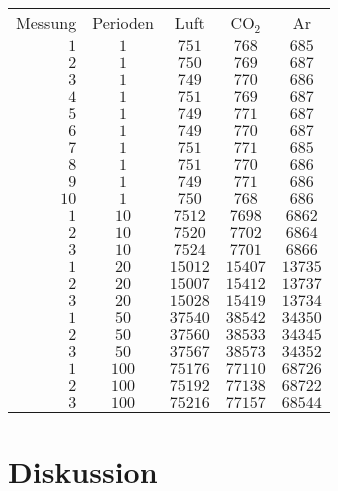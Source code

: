 \documentclass[12pt, a4paper, twoside]{scrartcl}
\begin{document}
\begin{table}
\centering
\begin{tabular}{r|c||c|c|c}
    Messung & Perioden & Luft & CO$_2$ & Ar \\
    $1 $&$ 1 $&$ 751 $&$ 768 $&$ 685$ \\
    $2 $&$ 1 $&$ 750 $&$ 769 $&$ 687$ \\
    $3 $&$ 1 $&$ 749 $&$ 770 $&$ 686$ \\
    $4 $&$ 1 $&$ 751 $&$ 769 $&$ 687$ \\
    $5 $&$ 1 $&$ 749 $&$ 771 $&$ 687$ \\
    $6 $&$ 1 $&$ 749 $&$ 770 $&$ 687$ \\
    $7 $&$ 1 $&$ 751 $&$ 771 $&$ 685$ \\
    $8 $&$ 1 $&$ 751 $&$ 770 $&$ 686$ \\
    $9 $&$ 1 $&$ 749 $&$ 771 $&$ 686$ \\
    $10 $&$ 1 $&$ 750 $&$ 768 $&$ 686$ \\
    \hline
    $1 $&$ 10 $&$ 7512 $&$ 7698 $&$ 6862$ \\
    $2 $&$ 10 $&$ 7520 $&$ 7702 $&$ 6864$ \\
    $3 $&$ 10 $&$ 7524 $&$ 7701 $&$ 6866$ \\
    \hline
    $1 $&$ 20 $&$ 15012 $&$ 15407 $&$ 13735$ \\
    $2 $&$ 20 $&$ 15007 $&$ 15412 $&$ 13737$ \\
    $3 $&$ 20 $&$ 15028 $&$ 15419 $&$ 13734$ \\
    \hline
    $1 $&$ 50 $&$ 37540 $&$ 38542 $&$ 34350$ \\
    $2 $&$ 50 $&$ 37560 $&$ 38533 $&$ 34345 $\\
    $3 $&$ 50 $&$ 37567 $&$ 38573 $&$ 34352 $\\
    \hline
    $1 $&$ 100 $&$ 75176 $&$ 77110 $&$ 68726$ \\
    $2 $&$ 100 $&$ 75192 $&$ 77138 $&$ 68722$ \\
    $3 $&$ 100 $&$ 75216 $&$ 77157 $&$ 68544$ \\
    
 \end{tabular} 
 \caption{\label{tab:}}
\end{table}



%    


\section{Diskussion}
\label{sec:diskussion}
\end{document}
